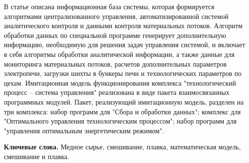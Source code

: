 В статье описана информационная база системы, которая формируется
алгоритмами централизованного управления, автоматизированной системой
аналитического контроля и данными контроля материальных потоков.
Алгоритм обработки данных по специальной программе генерирует
дополнительную информацию, необходимую для решения задач управления
системой, и включает в себя алгоритмы обработки аналитической
информации, а также данные для мониторинга материальных потоков,
расчетов дополнительных параметров электропечи, загрузки шихты в бункеры
печи и технологических параметров по цехам. Имитационная модель
функционирования комплекса "технологический процесс -- система
управления" реализована в виде пакета взаимосвязанных программных
модулей. Пакет, реализующий имитационную модель, разделен на три
комплекса: набор программ для "Сбора и обработки данных"; комплекс для
"Оптимального управления технологическим процессом"; набор программ для
"управления оптимальным энергетическим режимом".

{\bfseries Ключевые слова.} Медное сырье, смешивание, плавка,
математическая модель, смешивание и плавка.

